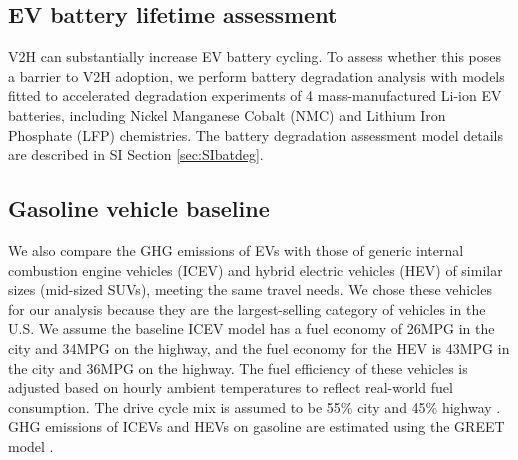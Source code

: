 \documentclass[11pt,preprint]{elsarticle}
\begin{document}
\subsection{EV battery lifetime assessment}

V2H can substantially increase EV battery cycling.  To assess whether this poses a barrier to V2H adoption, we perform battery degradation analysis with models fitted to accelerated degradation experiments of 4 mass-manufactured Li-ion EV batteries, including Nickel Manganese Cobalt (NMC) and Lithium Iron Phosphate (LFP) chemistries. The battery degradation assessment model details are described in SI Section \ref{sec:SIbatdeg}. 

\subsection{Gasoline vehicle baseline}

We also compare the GHG emissions of EVs with those of generic internal combustion engine vehicles (ICEV) and hybrid electric vehicles (HEV) of similar sizes (mid-sized SUVs), meeting the same travel needs. We chose these vehicles for our analysis because they are the largest-selling category of vehicles in the U.S. We assume the baseline ICEV model has a fuel economy of 26MPG in the city and 34MPG on the highway, and the fuel economy for the HEV is 43MPG in the city and 36MPG on the highway. The fuel efficiency of these vehicles is adjusted based on hourly ambient temperatures to reflect real-world fuel consumption. The drive cycle mix is assumed to be 55\% city and 45\% highway \cite{wu_regional_2019}. GHG emissions of ICEVs and HEVs on gasoline are estimated using the GREET model \cite{wang_greenhouse_2023}.
\end{document}
